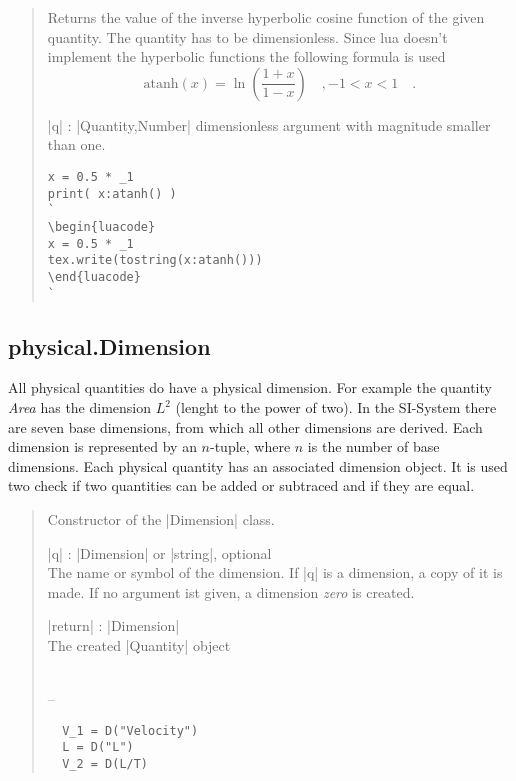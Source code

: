 \documentclass{ltxdoc}
\begin{document}
\begin{quote}
  Returns the value of the inverse hyperbolic cosine function of the given quantity. The quantity has to be dimensionless. Since lua doesn't implement the hyperbolic functions the following formula is used 
  $$
    \text{atanh}(x) = \ln\left( \frac{1 + x}{1 - x} \right)  \quad, -1 < x < 1 \quad.
  $$

  \begin{description}
  \item |q| : |Quantity,Number| dimensionless argument with magnitude smaller than one.
  \end{description}

\begin{lstlisting}
x = 0.5 * _1
print( x:atanh() )
`
\begin{luacode}
x = 0.5 * _1
tex.write(tostring(x:atanh()))
\end{luacode}
`
\end{lstlisting}

\end{quote}



%
%
%
%
\subsection{physical.Dimension}

 All physical quantities do have a physical dimension. For example the quantity \emph{Area} has the dimension $L^2$ (lenght to the power of two). In the SI-System there are seven base dimensions, from which all other dimensions are derived. Each dimension is represented by an $n$-tuple, where $n$ is the number of base dimensions. Each physical quantity has an associated dimension object. It is used two check if two quantities can be added or subtraced and if they are equal. 


\begin{quote}
  Constructor of the |Dimension| class.

  \subtitle{Parameters}
  \begin{description}
  \item |q| : |Dimension| or |string|, optional\\
    The name or symbol of the dimension. If |q| is a dimension, a copy of it is made. If no argument ist given, a dimension \emph{zero} is created.

  \item |return| : |Dimension|\\
    The created |Quantity| object
  \end{description}

  \subtitle{Notes}\\
  --

  \subtitle{Examples}
  \begin{lstlisting}
  V_1 = D("Velocity")
  L = D("L")
  V_2 = D(L/T)
  \end{lstlisting}
\end{quote}
\end{document}
